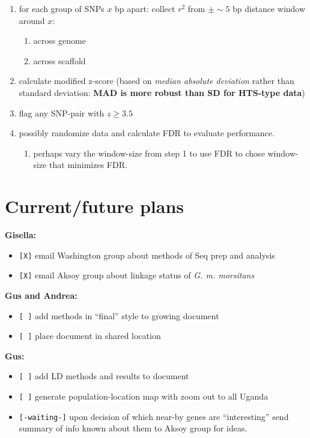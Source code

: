\documentclass[letterpaper]{scrartcl}
\begin{document}
\begin{enumerate}
\def\labelenumi{\arabic{enumi}.}
\itemsep1pt\parskip0pt
\item
  for each group of SNPs \(x\) bp apart: collect \(r^2\) from
  \(\pm \sim5\) bp distance window around \(x\):

  \begin{enumerate}
  \def\labelenumii{\alph{enumii}.}
  \itemsep1pt\parskip0pt
  \item
    across genome
  \item
    across scaffold
  \end{enumerate}
\item
  calculate modified z-score (based on \emph{median absolute deviation}
  rather than standard deviation: \textbf{MAD is more robust than SD for
  HTS-type data})
\item
  flag any SNP-pair with \(z \geq 3.5\)
\item
  possibly randomize data and calculate FDR to evaluate performance.

  \begin{enumerate}
  \def\labelenumii{\alph{enumii}.}
  \itemsep1pt\parskip0pt
  \item
    perhaps vary the window-size from step 1 to use FDR to chose
    window-size that minimizes FDR.
  \end{enumerate}
\end{enumerate}

\section{Current/future plans}\label{currentfuture-plans}

\textbf{Gisella:}

\begin{itemize}
\itemsep1pt\parskip0pt
\item
  \texttt{{[}X{]}} email Washington group about methods of Seq prep and
  analysis
\item
  \texttt{{[}X{]}} email Aksoy group about linkage status of \emph{G. m.
  morsitans}
\end{itemize}

\textbf{Gus and Andrea:}

\begin{itemize}
\itemsep1pt\parskip0pt
\item
  \texttt{{[} {]}} add methods in ``final'' style to growing document
\item
  \texttt{{[} {]}} place document in shared location
\end{itemize}

\textbf{Gus:}

\begin{itemize}
\itemsep1pt\parskip0pt
\item
  \texttt{{[} {]}} add LD methods and results to document
\item
  \texttt{{[} {]}} generate population-location map with zoom out to all
  Uganda
\item
  \texttt{{[}-waiting-{]}} upon decision of which near-by genes are
  ``interesting'' send summary of info known about them to Aksoy group
  for ideas.
\end{itemize}
\end{document}
